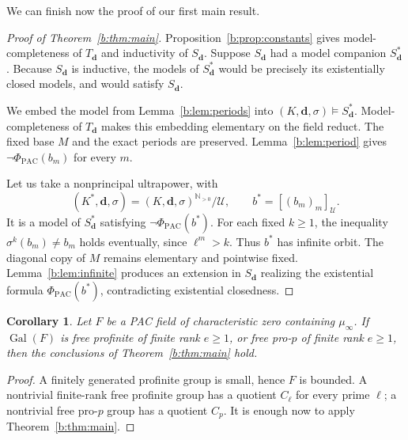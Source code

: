 \documentclass[10pt,a4paper]{amsart}
\renewcommand{\ge}{\geqslant}
\newtheorem{corollary}[theorem]{Corollary}
\theoremstyle{definition}
\newcommand{\N}{\mathbb N}
\newcommand{\bd}{\boldsymbol d}
\DeclareMathOperator{\Gal}{Gal}
\begin{document}
We can finish now the proof of our first main result.
\begin{proof}[Proof of Theorem~\ref{b:thm:main}]
Proposition~\ref{b:prop:constants} gives model-completeness of $T_{\bd}$
and inductivity of $S_{\bd}$. Suppose $S_{\bd}$ had a model companion
$S_{\bd}^*$. Because $S_{\bd}$ is inductive, the models of $S_{\bd}^*$
would be precisely its existentially closed models, and would
satisfy $S_{\bd}$.

We embed the model from Lemma~\ref{b:lem:periods} into
$(K,\bd,\sigma)\models S_{\bd}^*$. Model-completeness of $T_{\bd}$
makes this embedding elementary on the field reduct. The fixed base
$M$ and the exact periods are preserved. Lemma~\ref{b:lem:period}
gives $\neg\Phi_{\mathrm{PAC}}(b_m)$ for every $m$.

Let us take a nonprincipal ultrapower, with
\[
(K^*,\bd,\sigma)=(K,\bd,\sigma)^{\N_{>0}}/\mathcal U,\qquad
b^*=[(b_m)_m]_{\mathcal U}.
\]
It is a model of $S_{\bd}^*$ satisfying $\neg\Phi_{\mathrm{PAC}}(b^*)$. For each fixed
$k\ge1$, the inequality $\sigma^k(b_m)\ne b_m$ holds eventually,
since $\ell^m>k$. Thus $b^*$ has infinite orbit. The diagonal copy
of $M$ remains elementary and pointwise fixed. Lemma~\ref{b:lem:infinite}
produces an extension in $S_{\bd}$ realizing the existential formula
$\Phi_{\mathrm{PAC}}(b^*)$, contradicting existential closedness.
\end{proof}


\begin{corollary}\label{b:cor:free}
Let $F$ be a PAC field of characteristic zero containing $\mu_\infty$.
If $\Gal(F)$ is free profinite of finite rank $e\ge1$, or free
pro-$p$ of finite rank $e\ge1$, then the conclusions of
Theorem~\ref{b:thm:main} hold.
\end{corollary}

\begin{proof}
A finitely generated profinite group is small, hence $F$ is bounded.
A nontrivial finite-rank free profinite group has a quotient $C_\ell$
for every prime $\ell$; a nontrivial free pro-$p$ group has a quotient
$C_p$. It is enough now to apply Theorem~\ref{b:thm:main}.
\end{proof}
\end{document}

